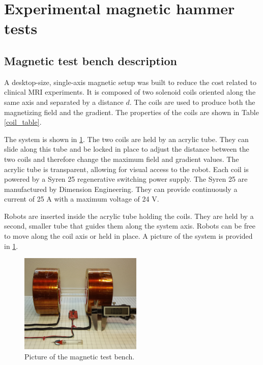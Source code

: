 \documentclass[letterpaper, 10 pt, journal, twoside]{ieeetran}
\begin{document}
\section{Experimental magnetic hammer tests}
\label{experiment}
\subsection{Magnetic test bench description}

A desktop-size, single-axis magnetic setup was built to reduce the cost related to clinical MRI experiments.
 It is composed of two solenoid coils oriented along the same axis and separated by a distance $d$. 
 The coils are used to produce both the magnetizing field and the gradient. 
 The properties of the coils are shown in Table \ref{coil_table}.\par
The system is shown in \cref{magnetic_setup}.
 The two coils are held by an acrylic tube. 
 They can slide along this tube and be locked in place to adjust the distance between the two coils and therefore change the maximum field and gradient values. 
 The acrylic tube is transparent, allowing for visual access to the robot.
Each coil is powered by a Syren 25 regenerative switching power supply. The Syren 25 are manufactured by Dimension Engineering. They can provide continuously a current of 25 A with a maximum voltage of 24 V.\par
Robots are inserted inside the acrylic tube holding the coils. 
They are held by a second, smaller tube that guides them along the system axis. 
Robots can be free to move along the coil axis or held in place. 
A picture of the system is provided in \cref{magnetic_setup}.

\begin{figure}
	\begin{centering}
  \includegraphics[width=165pt]{Magnetic_test_bench.jpg}
  \caption{Picture of the magnetic test bench.}
  \label{magnetic_setup}
	\end{centering}
	\vspace{-0.5em}
\end{figure}
\end{document}
